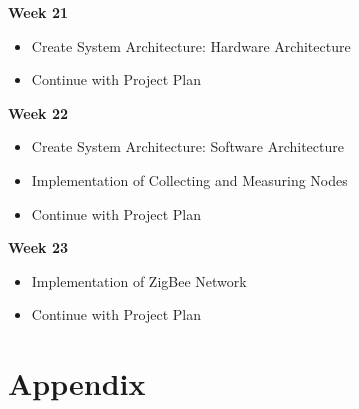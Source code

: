 \documentclass[
	11pt,
	a4paper
]{article}%
\begin{document}
\large{\textbf{Week 21}}
\begin{itemize}
\item Create System Architecture: Hardware Architecture
\item Continue with Project Plan
\end{itemize}
\large{\textbf{Week 22}}
\begin{itemize}
\item Create System Architecture: Software Architecture
\item Implementation of Collecting and Measuring Nodes
\item Continue with Project Plan 
\end{itemize}
\large{\textbf{Week 23}}
\begin{itemize}
\item Implementation of ZigBee Network
\item Continue with Project Plan 
\end{itemize}


\section{Appendix}
\begin{thebibliography}{9}
\end{thebibliography}
\end{document}
